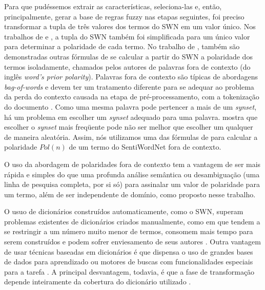 \documentclass[template.tex]{subfiles}
\begin{document}
 
Para que pudéssemos extrair as características, seleciona-las e, então, principalmente, gerar a base de regras fuzzy nas etapas seguintes, foi preciso transformar a tupla de três valores dos termos do SWN em um valor único. Nos trabalhos de  e , a tupla do SWN também foi simplificada para um único valor para determinar a polaridade de cada termo. No trabalho de , também são demonstradas outras fórmulas de se calcular a partir do SWN a polaridade dos termos isoladamente, chamados pelos autores de palavras fora de contexto (do inglês \textit{word’s prior polarity}). Palavras fora de contexto são típicas de abordagens \textit{bag-of-words} e devem ter um tratamento diferente para se adequar ao problema da perda do contexto causada na etapa de pré-processamento, com a tokenização do documento \cite{guerini2013sentiment}. Como uma mesma palavra pode pertencer a mais de um \textit{synset}, há um problema em escolher um \textit{synset} adequado para uma palavra.  mostra que escolher o \textit{synset} mais freqüente pode não ser melhor que escolher um qualquer de maneira aleatória. Assim, nós utilizamos uma das fórmulas de  para calcular a polaridade $Pol(n)$ de um termo do SentiWordNet fora de contexto. 


O uso da abordagem de polaridades fora de contexto tem a vantagem de ser mais rápida e simples do que uma profunda análise semântica ou desambiguação (uma linha de pesquisa completa, por si só) para assinalar um valor de polaridade para um termo, além de ser independente de domínio, como proposto nesse trabalho. 

O usuo de dicionários construídos automaticamente, como o SWN, superam problemas existentes de dicionários criados manualmente, como em \cite{taboada2008extracting, taboada2011lexicon} que tendem a se restringir a um número muito menor de termos, consomem mais tempo para serem construídos e podem sofrer enviesamento de seus autores \cite{ohana2009sentiment}. Outra vantagem de usar técnicas baseadas em dicionários é que dispensa o uso de grandes bases de dados para aprendizado ou motores de buscas com funcionalidades especiais para a tarefa \cite{khan2011sentiment}. A principal desvantagem, todavia, é que a fase de  transformação depende inteiramente da cobertura do dicionário utilizado \cite{khan2011sentiment}. 
\end{document}
